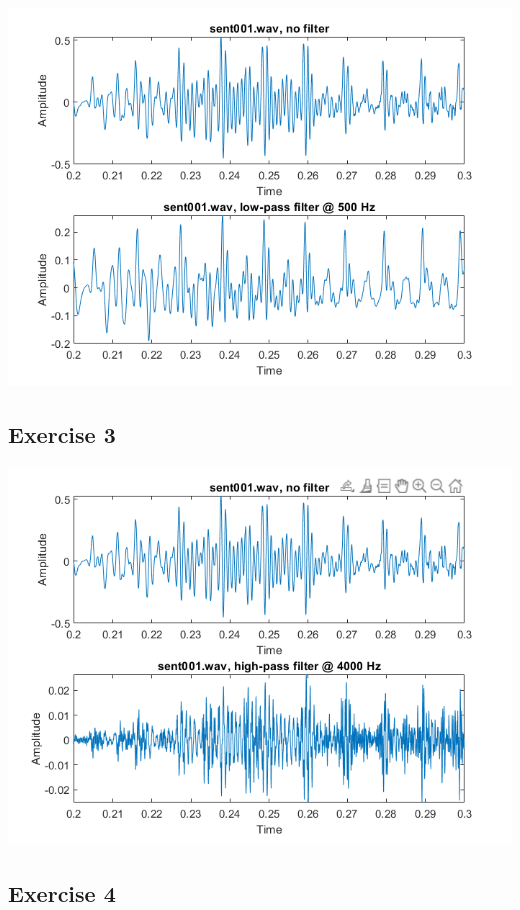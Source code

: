 \documentclass[11pt]{article}
\begin{document}


\includegraphics[width=\textwidth]{exercise2.png}

\subsection{Exercise 3}



\includegraphics[width=\textwidth]{exercise3.png}

\subsection{Exercise 4}
\end{document}

